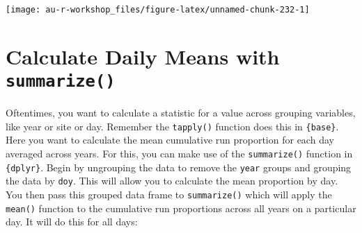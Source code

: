 \documentclass[]{book}
\newenvironment{Shaded}{\begin{snugshade}}{\end{snugshade}}
\newcommand{\KeywordTok}[1]{\textcolor[rgb]{0.13,0.29,0.53}{\textbf{#1}}}
\newcommand{\DataTypeTok}[1]{\textcolor[rgb]{0.13,0.29,0.53}{#1}}
\newcommand{\DecValTok}[1]{\textcolor[rgb]{0.00,0.00,0.81}{#1}}
\newcommand{\StringTok}[1]{\textcolor[rgb]{0.31,0.60,0.02}{#1}}
\newcommand{\CommentTok}[1]{\textcolor[rgb]{0.56,0.35,0.01}{\textit{#1}}}
\newcommand{\ControlFlowTok}[1]{\textcolor[rgb]{0.13,0.29,0.53}{\textbf{#1}}}
\newcommand{\OperatorTok}[1]{\textcolor[rgb]{0.81,0.36,0.00}{\textbf{#1}}}
\newcommand{\NormalTok}[1]{#1}
\theoremstyle{definition}
\theoremstyle{definition}
\theoremstyle{definition}
\theoremstyle{remark}
\begin{document}
\begin{Shaded}
\end{Shaded}

\begin{center}\texttt{[image: au-r-workshop\_files/figure-latex/unnamed-chunk-232-1]} \end{center}

\section{\texorpdfstring{Calculate Daily Means with
\texttt{summarize()}}{Calculate Daily Means with summarize()}}\label{calculate-daily-means-with-summarize}

Oftentimes, you want to calculate a statistic for a value across
grouping variables, like year or site or day. Remember the
\texttt{tapply()} function does this in \texttt{\{base\}}. Here you want
to calculate the mean cumulative run proportion for each day averaged
across years. For this, you can make use of the \texttt{summarize()}
function in \texttt{\{dplyr\}}. Begin by ungrouping the data to remove
the \texttt{year} groups and grouping the data by \texttt{doy}. This
will allow you to calculate the mean proportion by day. You then pass
this grouped data frame to \texttt{summarize()} which will apply the
\texttt{mean()} function to the cumulative run proportions across all
years on a particular day. It will do this for all days:
\end{document}
